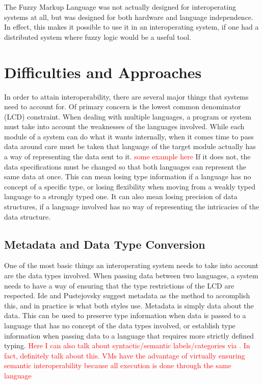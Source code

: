 \documentclass{sig-alternate}
\newcommand{\mycomment}[1]{\textcolor{red}{#1}}
\begin{document}
The Fuzzy Markup Language was not actually designed for interoperating systems at all, but was designed for both hardware and language independence. In effect, this makes it possible to use it in an interoperating system, if one had a distributed system where fuzzy logic would be a useful tool.

\section{Difficulties and Approaches}\label{approaches}
In order to attain interoperability, there are several major things that systems need to account for. Of primary concern is the lowest common denominator (LCD) constraint.
When dealing with multiple languages, a program or system must take into account the weaknesses of the languages involved. While each module of a system can do what it wants internally, when it comes time to pass data around care must be taken that language of the target module actually has a way of representing the data sent to it. \mycomment{some example here}
If it does not, the data specifications must be changed so that both languages can represent the same data at once. This can mean losing type information if a language has no concept of a specific type, or losing flexibility when moving from a weakly typed language to a strongly typed one. It can also mean losing precision of data structures, if a language involved has no way of representing the intricacies of the data structure.

\subsection{Metadata and Data Type Conversion}\label{metadata} \mycomment{\cite{Ide:2010, Bromberg:2011, Hamilton:2003}}
One of the most basic things an interoperating system needs to take into account are the data types involved. 
When passing data between two languages, a system needs to have a way of ensuring that the type restrictions of the LCD are respected. Ide and Pustejovsky \cite{Ide:2010} suggest metadata as the method to accomplish this, and in practice is what both styles use. Metadata is simply data about the data. This can be used to preserve type information when data is passed to a language that has no concept of the data types involved, or establish type information when passing data to a language that requires more strictly defined typing.
\mycomment{Here I can also talk about syntactic/semantic labels/categories via \cite{Ide:2010}. In fact, definitely talk about this. VMs have the advantage of virtually ensuring semantic interoperability because all execution is done through the same language}
\end{document}
